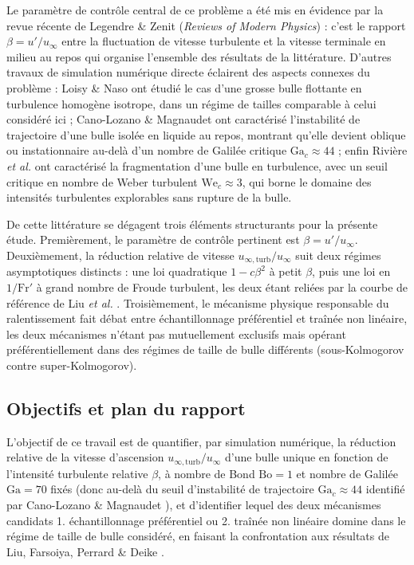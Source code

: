 Le paramètre de contrôle central de ce problème a été mis en évidence par la
revue récente de Legendre \& Zenit \cite{legendre2025} (\emph{Reviews of Modern
Physics}) : c'est le rapport $\beta = u'/u_\infty$ entre la fluctuation de
vitesse turbulente et la vitesse terminale en milieu au repos qui organise
l'ensemble des résultats de la littérature. D'autres travaux de simulation numérique
directe éclairent des aspects connexes du problème : Loisy \& Naso
\cite{loisy2017} ont étudié le cas d'une grosse bulle flottante en turbulence
homogène isotrope, dans un régime de tailles comparable à celui considéré ici ;
Cano-Lozano \& Magnaudet \cite{canolozano2016} ont caractérisé l'instabilité de
trajectoire d'une bulle isolée en liquide au repos, montrant qu'elle devient
oblique ou instationnaire au-delà d'un nombre de Galilée critique
$\mathrm{Ga}_c \approx 44$ ; enfin Rivière \emph{et al.} \cite{riviere2021} ont
caractérisé la fragmentation d'une bulle en turbulence, avec un seuil critique en
nombre de Weber turbulent $\mathrm{We}_c \approx 3$, qui borne le domaine des
intensités turbulentes explorables sans rupture de la bulle.

De cette littérature se dégagent trois éléments structurants pour la présente
étude. Premièrement, le paramètre de contrôle pertinent est $\beta = u'/u_\infty$. Deuxièmement, la réduction relative de vitesse
$u_{\infty,\mathrm{turb}}/u_\infty$ suit deux régimes asymptotiques distincts : une
loi quadratique $1-c\beta^2$ à petit $\beta$, puis une loi en $1/\mathrm{Fr}'$ à
grand nombre de Froude turbulent, les deux étant reliées par la courbe de référence
de Liu \emph{et al.} \cite{liu2024}. Troisièmement, le mécanisme physique
responsable du ralentissement fait débat entre échantillonnage préférentiel et
traînée non linéaire, les deux mécanismes n'étant pas mutuellement exclusifs mais
opérant préférentiellement dans des régimes de taille de bulle différents
(sous-Kolmogorov contre super-Kolmogorov).


\subsection{Objectifs et plan du rapport}

L'objectif de ce travail est de quantifier, par simulation numérique, la
réduction relative de la vitesse d'ascension $u_{\infty,\mathrm{turb}}/u_\infty$
d'une bulle unique en fonction de l'intensité turbulente relative $\beta$, à
nombre de Bond $\mathrm{Bo}=1$ et nombre de Galilée $\mathrm{Ga}=70$ fixés (donc
au-delà du seuil d'instabilité de trajectoire $\mathrm{Ga}_c\approx44$ identifié
par Cano-Lozano \& Magnaudet \cite{canolozano2016}), et d'identifier lequel des
deux mécanismes candidats 1. échantillonnage préférentiel ou 2. traînée non linéaire domine dans le régime de taille de bulle considéré, en faisant la confrontation aux résultats de Liu, Farsoiya, Perrard \& Deike
\cite{liu2024}.

